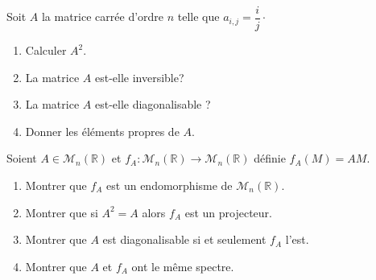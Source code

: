 \documentclass[french,11pt,twoside]{VcCours}
\begin{document}


\begin{Exercice}
  Soit $A$ la matrice carrée d'ordre $n$ telle que $a_{i,j} = \dfrac{i}{j} \cdot$

  \begin{enumerate}
  \item Calculer $A^2$.
  \item La matrice $A$ est-elle inversible?
  \item La matrice $A$ est-elle diagonalisable ?
  \item Donner les éléments propres de $A$.
  \end{enumerate}
\end{Exercice}


\begin{Exercice}
  Soient $A \in \mathcal{M}_n(\mathbb{R})$ et $f_A : \mathcal{M}_n(\mathbb{R}) \rightarrow \mathcal{M}_n(\mathbb{R})$ définie $f_A(M)=AM$.

  \begin{enumerate}
  \item Montrer que $f_A$ est un endomorphisme de $\mathcal{M}_n(\mathbb{R})$.
  \item Montrer que si $A^2=A$ alors $f_A$ est un projecteur.
  \item Montrer que $A$ est diagonalisable si et seulement $f_A$ l'est.
  \item Montrer que $A$ et $f_A$ ont le même spectre.
  \end{enumerate}
\end{Exercice}
\end{document}
